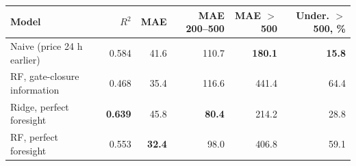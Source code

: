 \begin{tabular}{lrrrrr}
\toprule
Model & $R^2$ & MAE & MAE 200--500 & MAE $>$500 & Under. $>$500, \% \\
\midrule
Naive (price 24 h earlier) & 0.584 & 41.6 & 110.7 & \textbf{180.1} & \textbf{15.8} \\
RF, gate-closure information & 0.468 & 35.4 & 116.6 & 441.4 & 64.4 \\
Ridge, perfect foresight & \textbf{0.639} & 45.8 & \textbf{80.4} & 214.2 & 28.8 \\
RF, perfect foresight & 0.553 & \textbf{32.4} & 98.0 & 406.8 & 59.1 \\
\bottomrule
\end{tabular}
